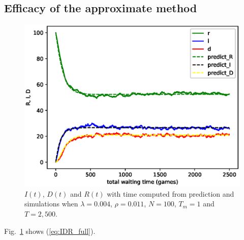 \subsection{Efficacy of the approximate method}
\begin{figure}
  \includegraphics[width=.45\textwidth]{fig/twohop_with_fully_detection.eps}
  \caption{$I(t)$, $D(t)$ and $R(t)$ with time computed from prediction and simulations when $\lambda = 0.004$, $\rho = 0.011$, $N=100$,
  $T_{m} = 1$ and $T=2,500$.}
  \label{fig:twohop_predict_full_d}
\end{figure}
Fig.~\ref{fig:twohop_predict_full_d} shows (\ref{eq:IDR_full}).


